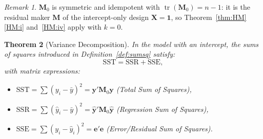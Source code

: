 \documentclass[14pt]{extarticle}
\theoremstyle{plain}
\newtheorem{theorem}{Theorem}[section]
\theoremstyle{definition}
\theoremstyle{remark}
\newtheorem{remark}[theorem]{Remark}
\DeclareMathOperator\tr{tr}
\newcommand{\SST}{\mathrm{SST}}
\newcommand{\SSR}{\mathrm{SSR}}
\newcommand{\SSE}{\mathrm{SSE}}
\newcommand{\bX}{\mathbf{X}}
\newcommand{\by}{\mathbf{y}}
\newcommand{\bM}{\mathbf{M}}
\newcommand{\bone}{\mathbf{1}}
\begin{document}
\begin{remark}\label{rem:M0-props}
$\bM_0$ is symmetric and idempotent with $\tr(\bM_0) = n - 1$: it is the residual maker $\bM$ of the intercept-only design $\bX = \bone$, so Theorem~\ref{thm:HM}\ref{HM:i} and~\ref{HM:iv} apply with $k = 0$.
\end{remark}

\begin{theorem}[Variance Decomposition]\label{thm:anova}
In the model with an intercept, the sums of squares introduced in Definition~\ref{def:sumsq} satisfy:
\begin{equation}
\boxed{\SST = \SSR + \SSE,}
\end{equation}
with matrix expressions:
\begin{itemize}
\item $\SST = \sum(y_i - \bar{y})^2 = \by'\bM_0\by$ \quad (Total Sum of Squares),
\item $\SSR = \sum(\hat{y}_i - \bar{y})^2 = \hat{\by}'\bM_0\hat{\by}$ \quad (Regression Sum of Squares),
\item $\SSE = \sum(y_i - \hat{y}_i)^2 = \mathbf{e}'\mathbf{e}$ \quad (Error/Residual Sum of Squares).
\end{itemize}
\end{theorem}
\end{document}
